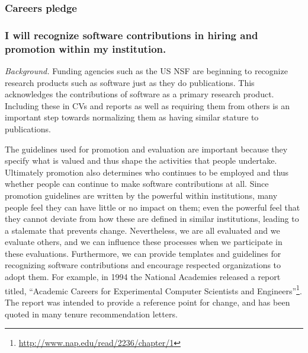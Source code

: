 \documentclass[a4paper,UKenglish]{dagman}
\renewcommand{\paragraph}[1]{\subsubsection*{#1}\xspace}
\newcommand{\etc}{\emph{etc.}\xspace}
\begin{document}
\subsubsection*{Careers pledge}

\paragraph{I will recognize software contributions in hiring and promotion within my institution.}

\emph{Background.}
Funding agencies such as the US NSF are beginning to recognize research products such as software just as they do publications. This acknowledges the contributions of software as a primary research product. Including these in CVs and reports as well as requiring them from others is an important step towards normalizing them as having similar stature to publications. 

The guidelines used for promotion and evaluation are important because they specify what is valued and thus shape the activities that people undertake. Ultimately promotion also determines who continues to be employed and thus whether people can continue to make software contributions at all. Since promotion guidelines are written by the powerful within institutions, many people feel they can have little or no impact on them; even the powerful feel that they cannot deviate from how these are defined in similar institutions, leading to a stalemate that prevents change.
Nevertheless, we are all evaluated and we evaluate others, and we can influence these processes when we participate in these evaluations.
Furthermore, we can provide templates and guidelines for recognizing software contributions and encourage respected organizations to adopt them.
For example, in 1994 the National Academies released a report titled, ``Academic Careers for Experimental Computer Scientists and Engineers''\footnote{\url{http://www.nap.edu/read/2236/chapter/1}}. The report was intended to provide a reference point for change, and has been quoted in many tenure recommendation letters.
\end{document}
